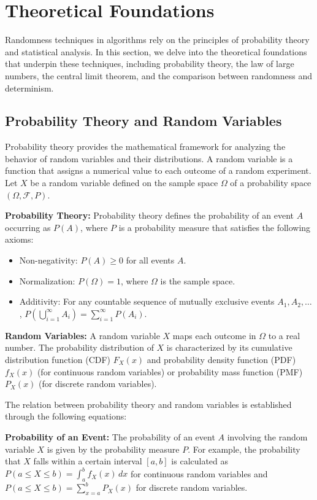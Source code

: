 \documentclass[12pt]{book} %
\begin{document}
\section{Theoretical Foundations}
Randomness techniques in algorithms rely on the principles of probability theory and statistical analysis. In this section, we delve into the theoretical foundations that underpin these techniques, including probability theory, the law of large numbers, the central limit theorem, and the comparison between randomness and determinism.

\subsection{Probability Theory and Random Variables}
Probability theory provides the mathematical framework for analyzing the behavior of random variables and their distributions. A random variable is a function that assigns a numerical value to each outcome of a random experiment. Let \(X\) be a random variable defined on the sample space \(\Omega\) of a probability space \((\Omega, \mathcal{F}, P)\).

\textbf{Probability Theory:} Probability theory defines the probability of an event \(A\) occurring as \(P(A)\), where \(P\) is a probability measure that satisfies the following axioms:
\begin{itemize}
    \item Non-negativity: \(P(A) \geq 0\) for all events \(A\).
    \item Normalization: \(P(\Omega) = 1\), where \(\Omega\) is the sample space.
    \item Additivity: For any countable sequence of mutually exclusive events \(A_1, A_2, \ldots\), \(P\left(\bigcup_{i=1}^\infty A_i\right) = \sum_{i=1}^\infty P(A_i)\).
\end{itemize}

\textbf{Random Variables:} A random variable \(X\) maps each outcome in \(\Omega\) to a real number. The probability distribution of \(X\) is characterized by its cumulative distribution function (CDF) \(F_X(x)\) and probability density function (PDF) \(f_X(x)\) (for continuous random variables) or probability mass function (PMF) \(P_X(x)\) (for discrete random variables).

The relation between probability theory and random variables is established through the following equations:

\textbf{Probability of an Event:} The probability of an event \(A\) involving the random variable \(X\) is given by the probability measure \(P\). For example, the probability that \(X\) falls within a certain interval \([a, b]\) is calculated as \(P(a \leq X \leq b) = \int_a^b f_X(x) \, dx\) for continuous random variables and \(P(a \leq X \leq b) = \sum_{x=a}^b P_X(x)\) for discrete random variables.
\end{document}
